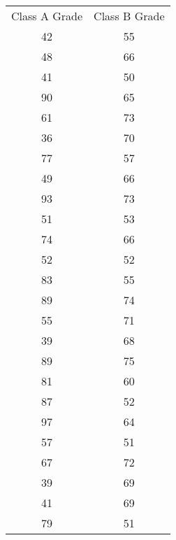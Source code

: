 \begin{tabular}{cc}
 Class A Grade &  Class B Grade \\
            42 &             55 \\
            48 &             66 \\
            41 &             50 \\
            90 &             65 \\
            61 &             73 \\
            36 &             70 \\
            77 &             57 \\
            49 &             66 \\
            93 &             73 \\
            51 &             53 \\
            74 &             66 \\
            52 &             52 \\
            83 &             55 \\
            89 &             74 \\
            55 &             71 \\
            39 &             68 \\
            89 &             75 \\
            81 &             60 \\
            87 &             52 \\
            97 &             64 \\
            57 &             51 \\
            67 &             72 \\
            39 &             69 \\
            41 &             69 \\
            79 &             51 \\
\end{tabular}

